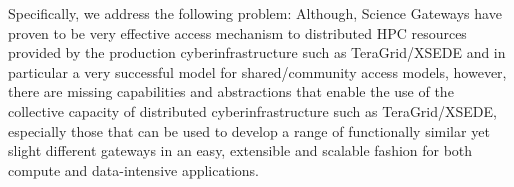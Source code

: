 \documentclass[]{svjour3}
\begin{document}
Specifically, we address the following problem: Although, Science
Gateways have proven to be very effective access mechanism to
distributed HPC resources provided by the production
cyberinfrastructure such as TeraGrid/XSEDE and in particular a very
successful model for shared/community access models, however, there
are missing capabilities and abstractions that enable the use of the
collective capacity of distributed cyberinfrastructure such as
TeraGrid/XSEDE, especially those that can be used to develop a range
of functionally similar yet slight different gateways in an easy,
extensible and scalable fashion for both compute and data-intensive
applications.






\end{document}
